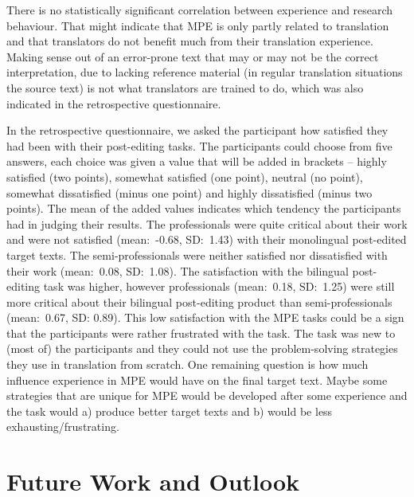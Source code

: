 \documentclass[output=paper]{langsci/langscibook}
\begin{document}
There is no statistically significant correlation between experience and research behaviour. That might indicate that MPE is only partly related to translation and that translators do not benefit much from their translation experience. Making sense out of an error-prone text that may or may not be the correct interpretation, due to lacking reference material (in regular translation situations the source text) is not what translators are trained to do, which was also indicated in the retrospective questionnaire.



In the retrospective questionnaire, we asked the participant how satisfied they had been with their post-editing tasks. The participants could choose from five answers, each choice was given a value that will be added in brackets – highly satisfied (two points), somewhat satisfied (one point), neutral (no point), somewhat dissatisfied (minus one point) and highly dissatisfied (minus two points). The mean of the added values indicates which tendency the participants had in judging their results. The professionals were quite critical about their work and were not satisfied (mean:~-0.68, SD:~1.43) with their monolingual post-edited target texts. The semi-professionals were neither satisfied nor dissatisfied with their work (mean:~0.08, SD:~1.08). The satisfaction with the bilingual post-editing task was higher, however professionals (mean:~0.18, SD:~1.25) were still more critical about their bilingual post-editing product than semi-professionals (mean:~0.67, SD: 0.89). This low satisfaction with the MPE tasks could be a sign that the participants were rather frustrated with the task. The task was new to (most of) the participants and they could not use the problem-solving strategies they use in translation from scratch. One remaining question is how much influence experience in MPE would have on the final target text. Maybe some strategies that are unique for MPE would be developed after some experience and the task would a) produce better target texts and b) would be less exhausting/frustrating.


\section{Future Work and Outlook}
\end{document}
